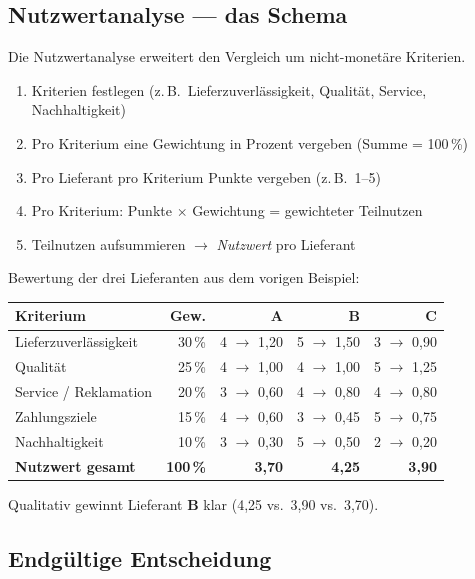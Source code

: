 \documentclass[11pt, a4paper]{article}
\begin{document}
\subsection{Nutzwertanalyse --- das Schema}

Die Nutzwertanalyse erweitert den Vergleich um nicht-monetäre Kriterien.

\begin{enumerate}
  \item Kriterien festlegen (z.\,B.\ Lieferzuverlässigkeit, Qualität, Service, Nachhaltigkeit)
  \item Pro Kriterium eine Gewichtung in Prozent vergeben (Summe = 100\,\%)
  \item Pro Lieferant pro Kriterium Punkte vergeben (z.\,B.\ 1--5)
  \item Pro Kriterium: Punkte $\times$ Gewichtung = gewichteter Teilnutzen
  \item Teilnutzen aufsummieren $\to$ \emph{Nutzwert} pro Lieferant
\end{enumerate}

\begin{beispiel}
Bewertung der drei Lieferanten aus dem vorigen Beispiel:

\begin{center}
\begin{tabular}{lrrrr}
\toprule
\textbf{Kriterium} & \textbf{Gew.} & \textbf{A} & \textbf{B} & \textbf{C}\\
\midrule
Lieferzuverlässigkeit & 30\,\% & 4 $\to$ 1{,}20 & 5 $\to$ 1{,}50 & 3 $\to$ 0{,}90\\
Qualität & 25\,\% & 4 $\to$ 1{,}00 & 4 $\to$ 1{,}00 & 5 $\to$ 1{,}25\\
Service / Reklamation & 20\,\% & 3 $\to$ 0{,}60 & 4 $\to$ 0{,}80 & 4 $\to$ 0{,}80\\
Zahlungsziele & 15\,\% & 4 $\to$ 0{,}60 & 3 $\to$ 0{,}45 & 5 $\to$ 0{,}75\\
Nachhaltigkeit & 10\,\% & 3 $\to$ 0{,}30 & 5 $\to$ 0{,}50 & 2 $\to$ 0{,}20\\
\midrule
\textbf{Nutzwert gesamt} & \textbf{100\,\%} & \textbf{3{,}70} & \textbf{4{,}25} & \textbf{3{,}90}\\
\bottomrule
\end{tabular}
\end{center}

Qualitativ gewinnt Lieferant \textbf{B} klar (4{,}25 vs.\ 3{,}90 vs.\ 3{,}70).
\end{beispiel}

\subsection{Endgültige Entscheidung}
\end{document}

